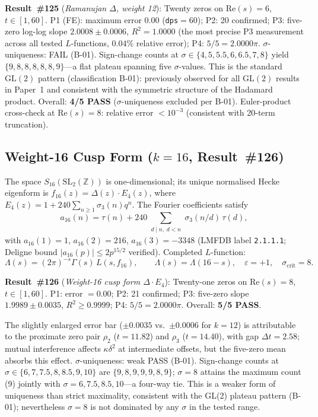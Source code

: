 \documentclass[11pt, a4paper]{article}
\theoremstyle{plain}
\theoremstyle{definition}
\begin{document}
\medskip
\noindent\textbf{Result~\#125} (\textit{Ramanujan $\Delta$, weight 12}):
Twenty zeros on $\mathrm{Re}(s)=6$, $t\in[1,60]$.
P1 (FE): maximum error $0.00$ (\texttt{dps}$=60$); P2: 20 confirmed;
P3: five-zero log-log slope $\mathbf{2.0008\pm 0.0006}$, $R^{2}=1.0000$
(the most precise P3 measurement across all tested $L$-functions, $0.04\%$
relative error); P4: $5/5=2.0000\pi$.
$\sigma$-uniqueness: FAIL (B-01).  Sign-change counts at
$\sigma\in\{4,5,5.5,6,6.5,7,8\}$ yield $\{9,8,8,8,8,8,9\}$---a flat
plateau spanning five $\sigma$-values.  This is the standard
$\mathrm{GL}(2)$ pattern (classification B-01): previously observed for
all $\mathrm{GL}(2)$ results in Paper~1 and consistent with the symmetric
structure of the Hadamard product.  Overall: \textbf{4/5 PASS}
($\sigma$-uniqueness excluded per B-01).  Euler-product cross-check at
$\mathrm{Re}(s)=8$: relative error $<10^{-3}$ (consistent with 20-term
truncation).

\subsection{Weight-16 Cusp Form ($k=16$, Result~\#126)}
\label{ssec:w16}

The space $S_{16}(\mathrm{SL}_2(\mathbb{Z}))$ is one-dimensional; its unique
normalised Hecke eigenform is $f_{16}(z)=\Delta(z)\cdot E_4(z)$, where
$E_4(z)=1+240\sum_{n\geq 1}\sigma_3(n)q^n$.  The Fourier coefficients
satisfy
\[
  a_{16}(n)=\tau(n)+240\sum_{\substack{d\mid n,\;d<n}}\sigma_3(n/d)\,\tau(d),
\]
with $a_{16}(1)=1$, $a_{16}(2)=216$, $a_{16}(3)=-3348$
(LMFDB label \texttt{2.1.1.1}; Deligne bound $|a_{16}(p)|\leq 2p^{15/2}$
verified).  Completed $L$-function:
\[
  \Lambda(s)=(2\pi)^{-s}\Gamma(s)\,L(s,f_{16}), \qquad
  \Lambda(s)=\Lambda(16-s), \quad \varepsilon=+1, \quad
  \sigma_{\mathrm{crit}}=8.
\]

\noindent\textbf{Result~\#126} (\textit{Weight-16 cusp form $\Delta\cdot E_4$}):
Twenty-one zeros on $\mathrm{Re}(s)=8$, $t\in[1,60]$.
P1: error $=0.00$; P2: 21 confirmed;
P3: five-zero slope $\mathbf{1.9989\pm 0.0035}$, $R^{2}\geq 0.9999$;
P4: $5/5=2.0000\pi$.  Overall: \textbf{5/5 PASS}.

The slightly enlarged error bar ($\pm 0.0035$ vs.\ $\pm 0.0006$ for $k=12$)
is attributable to the proximate zero pair $\rho_2$ ($t=11.82$) and
$\rho_3$ ($t=14.40$), with gap $\Delta t=2.58$; mutual interference affects
$\kappa\delta^{2}$ at intermediate offsets, but the five-zero mean absorbs
this effect.
$\sigma$-uniqueness: weak PASS (B-01).  Sign-change counts at
$\sigma\in\{6,7,7.5,8,8.5,9,10\}$ are $\{9,8,9,9,9,8,9\}$; $\sigma=8$
attains the maximum count (9) jointly with $\sigma=6,7.5,8.5,10$---a
four-way tie.  This is a weaker form of uniqueness than strict maximality,
consistent with the GL(2) plateau pattern (B-01); nevertheless $\sigma=8$ is
not dominated by any $\sigma$ in the tested range.
\end{document}
